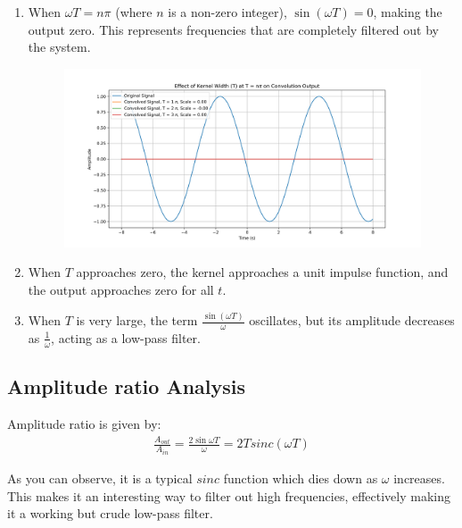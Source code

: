\begin{enumerate}
\item When $\omega T = n\pi$ (where $n$ is a non-zero integer), $\sin(\omega T) = 0$, making the output zero. This represents frequencies that are completely filtered out by the system.

\begin{figure}[!ht]
    \begin{center}
        \includegraphics[width=1\textwidth]{codes/codes_sin_3_and_smoothening/figs/varying_T_pi_effect.png}
    \end{center}
\end{figure}
\FloatBarrier

\item When $T$ approaches zero, the kernel approaches a unit impulse function, and the output approaches zero for all $t$.

\item When $T$ is very large, the term $\frac{\sin(\omega T)}{\omega}$ oscillates, but its amplitude decreases as $\frac{1}{\omega}$, acting as a low-pass filter.
\end{enumerate}

\subsection{Amplitude ratio Analysis}
Amplitude ratio is given by:
\begin{align}
    \frac{A_{out}}{A_{in}} = \frac{2\sin{\omega T}}{\omega} = 2T sinc(\omega T)
\end{align}

As you can observe, it is a typical $sinc$ function which dies down as $\omega$ increases. This makes it an interesting way to filter out high frequencies, effectively making it a working but crude low-pass filter.

